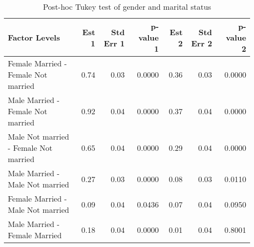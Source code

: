 \documentclass[11pt]{extarticle} %
\begin{document}
\begin{table}[ht]
\footnotesize
\centering
\begin{tabular}{lrrrrrr}
  \hline
Factor Levels & Est 1 & Std Err 1 & p-value 1 & Est 2 & Std Err 2 & p-value 2 \\ 
  \hline
  Female Married -  Female Not married & 0.74 & 0.03 & 0.0000 & 0.36 & 0.03 & 0.0000 \\ 
    Male Married -  Female Not married & 0.92 & 0.04 & 0.0000 & 0.37 & 0.04 & 0.0000 \\ 
    Male Not married -  Female Not married & 0.65 & 0.04 & 0.0000 & 0.29 & 0.04 & 0.0000 \\ 
    Male Married -  Male Not married & 0.27 & 0.03 & 0.0000 & 0.08 & 0.03 & 0.0110 \\ 
    Female Married -  Male Not married & 0.09 & 0.04 & 0.0436 & 0.07 & 0.04 & 0.0950 \\ 
    Male Married -  Female Married & 0.18 & 0.04 & 0.0000 & 0.01 & 0.04 & 0.8001 \\ 
   \hline
\end{tabular}
\caption{Post-hoc Tukey test of gender and marital status} 
\label{tab:Table6GenderMS}
\end{table}
\end{document}
